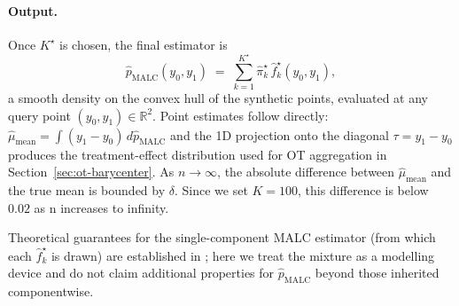 \documentclass[11pt]{article}
\theoremstyle{plain}
\theoremstyle{definition}
\theoremstyle{remark}
\begin{document}

\paragraph{Output.}
Once $K^{\star}$ is chosen, the final estimator is
\begin{equation}
  \hat{p}_{\mathrm{MALC}}(y_0, y_1)
  \;=\;
  \sum_{k=1}^{K^{\star}} \hat{\pi}_k^{\star}\, \hat{f}_k^{\star}(y_0, y_1),
  \label{eq:malc-output}
\end{equation}
a smooth density on the convex hull of the synthetic points, evaluated
at any query point $(y_0, y_1) \in \mathbb{R}^{2}$. Point estimates
follow directly:
$\hat{\mu}_{\mathrm{mean}} = \int (y_1 - y_0) \,d\hat{p}_{\mathrm{MALC}}$
and the 1D projection onto the diagonal $\tau = y_1 - y_0$ produces
the treatment-effect distribution used for OT aggregation in
Section~\ref{sec:ot-barycenter}. As $n \to \infty$, the absolute difference between
$\hat{\mu}_{\mathrm{mean}}$ and the true mean is bounded by $\delta$.
Since we set $K = 100$, this difference is below $0.02$ as n increases to infinity.

Theoretical guarantees for the
single-component MALC estimator (from which each $\hat{f}_k^\star$ is
drawn) are established in \citet{danisman2026malc}; here we treat the
mixture as a modelling device and do not claim additional properties for $\hat{p}_{\mathrm{MALC}}$ beyond those inherited componentwise.
\end{document}
